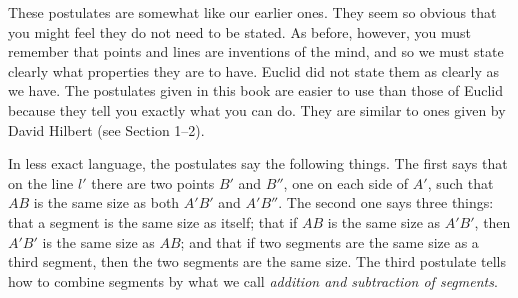 \documentclass[11pt]{book}
\begin{document}
These postulates are somewhat like our earlier ones. They seem so obvious that
you might feel they do not need to be stated. As before, however, you must
remember that points and lines are inventions of the mind, and so we must state
clearly what properties they are to have. Euclid did not state them as clearly as
we have. The postulates given in this book are easier to use than those of Euclid
because they tell you exactly what you can do. They are similar to ones given by
David Hilbert (see Section 1--2).

In less exact language, the postulates say the following things. The first says
that on the line $l'$ there are two points $B'$ and $B''$, one on each side of
$A'$, such that $AB$ is the same size as both $A'B'$ and $A'B''$. The second one
says three things: that a segment is the same size as itself; that if $AB$ is the
same size as $A'B'$, then $A'B'$ is the same size as $AB$; and that if two
segments are the same size as a third segment, then the two segments are the same
size. The third postulate tells how to combine segments by what we call
\emph{addition and subtraction of segments}.

\end{document}

